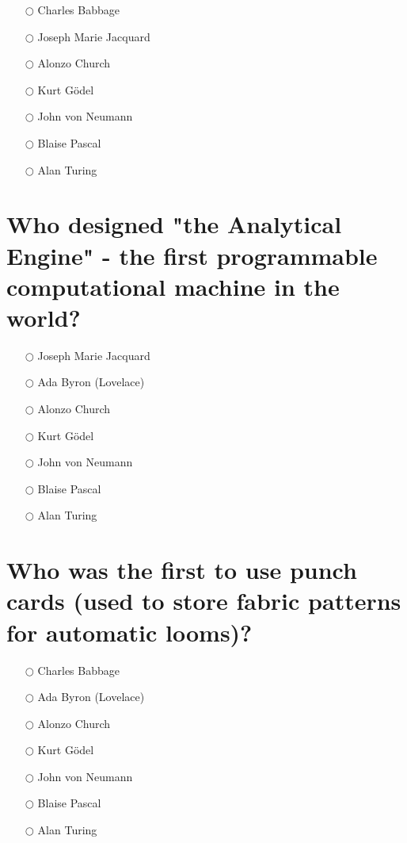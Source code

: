 \documentclass[a4paper,11pt,oneside]{book}
\begin{document}
\begin{sloppypar}
\label{q:434:mc:en:True}

\begin{itemize}
  \item[$\bigcirc$] Charles Babbage
  \item[$\bigcirc$] Joseph Marie Jacquard
  \item[$\bigcirc$] Alonzo Church
  \item[$\bigcirc$] Kurt G\"odel
  \item[$\bigcirc$] John von Neumann
  \item[$\bigcirc$] Blaise Pascal
  \item[$\bigcirc$] Alan Turing
\end{itemize}



\section{Who designed "the Analytical Engine" - the first programmable computational machine in the world?}

\label{q:435:mc:en:True}

\begin{itemize}
  \item[$\bigcirc$] Joseph Marie Jacquard
  \item[$\bigcirc$] Ada Byron (Lovelace)
  \item[$\bigcirc$] Alonzo Church
  \item[$\bigcirc$] Kurt G\"odel
  \item[$\bigcirc$] John von Neumann
  \item[$\bigcirc$] Blaise Pascal
  \item[$\bigcirc$] Alan Turing
\end{itemize}



\section{Who was the first to use punch cards (used to store fabric patterns for automatic looms)?}

\label{q:436:mc:en:True}

\begin{itemize}
  \item[$\bigcirc$] Charles Babbage
  \item[$\bigcirc$] Ada Byron (Lovelace)
  \item[$\bigcirc$] Alonzo Church
  \item[$\bigcirc$] Kurt G\"odel
  \item[$\bigcirc$] John von Neumann
  \item[$\bigcirc$] Blaise Pascal
  \item[$\bigcirc$] Alan Turing
\end{itemize}




\end{sloppypar}
\end{document}
